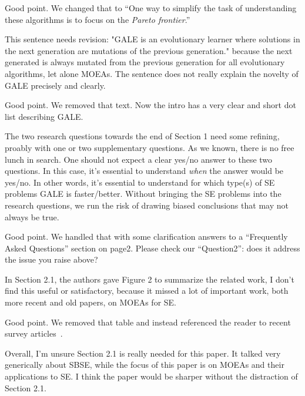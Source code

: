 \documentclass[10pt,journal,compsoc]{IEEEtran}
\newenvironment{changed}{\par}{\par}
\begin{document}
\begin{changed}
Good point. We changed that to 
``One way to simplify the task of understanding these
algorithms is to focus on the {\em Pareto frontier}.''
\end{changed}

This sentence needs revision: "GALE is an evolutionary learner where
solutions in the next generation are mutations of the previous
generation." because the next generated is always mutated from the
previous generation for all evolutionary algorithms, let alone MOEAs. The
sentence does not really explain the novelty of GALE precisely and
clearly.

\begin{changed}
Good point. We removed that text. Now the intro has a very clear and short
dot list describing GALE.
\end{changed}


The two research questions towards the end of Section 1 need some
refining, proably with one or two supplementary questions. As we known,
there is no free lunch in search. One should not expect a clear yes/no
answer to these two questions. In this case, it's essential to understand
{\em when} the answer would be yes/no. In other words, it's essential to
understand for which type(s) of SE problems GALE is faster/better. Without
bringing the SE problems into the research questions, we run the risk of
drawing biased conclusions that may not always be true.


\begin{changed}
Good point. We handled that with some clarification answers to a ``Frequently
Asked Questions'' section on page2. Please check our ``Question2'': does it
address the issue you raise above?
\end{changed}

In Section 2.1, the authors gave Figure 2 to summarize the related work,
I don't find this useful or satisfactory, because it missed a lot of
important work, both more recent and old papers, on MOEAs for SE.


\begin{changed}
Good point. We removed that table and instead referenced the reader 
to recent survey articles~\cite{harman12abc,harman14}.
\end{changed}

Overall, I'm unsure Section 2.1 is really needed for this paper. It
talked very generically about SBSE, while the focus of this paper is on
MOEAs and their applications to SE. I think the paper would be sharper
without the distraction of Section 2.1.
\end{document}
